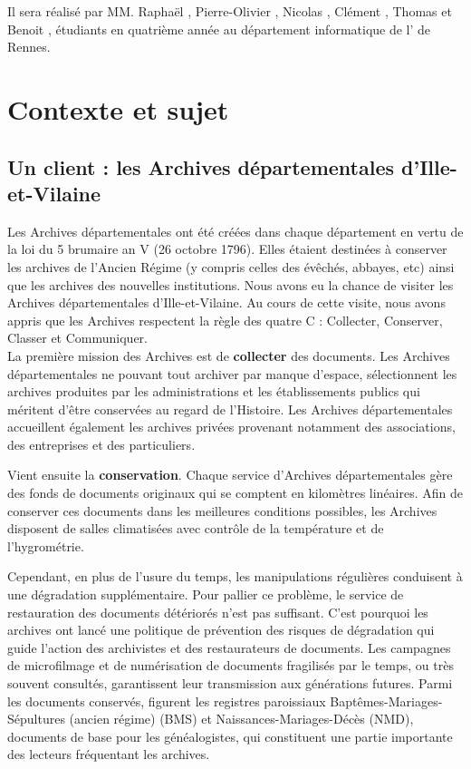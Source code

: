 \documentclass[a4paper]{article}
\begin{document}
	Il sera r\'ealis\'e par MM. Rapha\"el , Pierre-Olivier , Nicolas , Cl\'ement , Thomas  et Benoit , \'etudiants en quatri\`eme ann\'ee au d\'epartement informatique de l' de Rennes.

\newpage

\section{Contexte et sujet}
\label{sec:contexte}

\subsection{Un client : les Archives d\'epartementales d'Ille-et-Vilaine}
\label{subsec:client}

	Les Archives d\'epartementales ont \'et\'e cr\'e\'ees dans chaque d\'epartement en vertu de la loi du 5 brumaire an V (26 octobre 1796). Elles \'etaient destin\'ees \`a conserver les archives de l'Ancien R\'egime (y compris celles des \'ev\^ech\'es, abbayes, etc) ainsi que les archives des nouvelles institutions. 
Nous avons eu la chance de visiter les Archives d\'epartementales d'Ille-et-Vilaine. Au cours de cette visite, nous avons appris que les Archives respectent la r\`egle des quatre C : Collecter, Conserver, Classer et Communiquer.
\\

	La premi\`ere mission des Archives est de \textbf{collecter} des documents. Les Archives d\'epartementales ne pouvant tout archiver par manque d'espace, s\'electionnent les archives produites par les administrations et les \'etablissements publics qui m\'eritent d'\^etre conserv\'ees au regard de l'Histoire. 
Les Archives d\'epartementales accueillent \'egalement les archives priv\'ees provenant notamment des associations, des entreprises et des particuliers.

	Vient ensuite la \textbf{conservation}. Chaque service d'Archives d\'epartementales g\`ere des fonds de documents originaux qui se comptent en kilom\`etres lin\'eaires. Afin de conserver ces documents dans les meilleures conditions possibles, les Archives disposent de salles climatis\'ees avec contr\^ole de la temp\'erature et de l'hygrom\'etrie.
    
	Cependant, en plus de l'usure du temps, les manipulations r\'eguli\`eres condui\-sent \`a une d\'egradation suppl\'ementaire. Pour pallier ce probl\`eme, le service de restauration des documents d\'et\'erior\'es n'est pas suffisant. C'est pourquoi les archives ont lanc\'e une politique de pr\'evention des risques de d\'egradation qui guide l'action des archivistes et des restaurateurs de documents. Les campagnes de microfilmage et de num\'erisation de documents fragilis\'es par le temps, ou tr\`es souvent consult\'es, garantissent leur transmission aux g\'en\'erations futures. Parmi les documents conserv\'es, figurent les registres paroissiaux Bapt\^emes-Mariages-S\'epultures (ancien r\'egime) (BMS) et Naissances-Mariages-D\'ec\`es (NMD), documents de base pour les g\'en\'ealogistes, qui constituent une partie importante des lecteurs fr\'equentant les archives.
\end{document}

